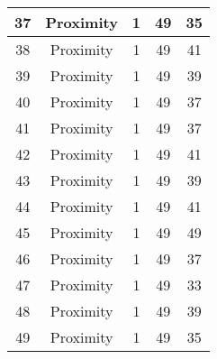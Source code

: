 \documentclass[results.tex]{subfiles}
\begin{document}
\begin{center}
\begin{tabular}{| c || c | c | c | c |}
            \hline
            37                      & Proximity                    & 1                      & 49                      & 35                   \\
            \hline
            38                      & Proximity                    & 1                      & 49                      & 41                   \\
            \hline
            39                      & Proximity                    & 1                      & 49                      & 39                   \\
            \hline
            40                      & Proximity                    & 1                      & 49                      & 37                   \\
            \hline
            41                      & Proximity                    & 1                      & 49                      & 37                   \\
            \hline
            42                      & Proximity                    & 1                      & 49                      & 41                   \\
            \hline
            43                      & Proximity                    & 1                      & 49                      & 39                   \\
            \hline
            44                      & Proximity                    & 1                      & 49                      & 41                   \\
            \hline
            45                      & Proximity                    & 1                      & 49                      & 49                   \\
            \hline
            46                      & Proximity                    & 1                      & 49                      & 37                   \\
            \hline
            47                      & Proximity                    & 1                      & 49                      & 33                   \\
            \hline
            48                      & Proximity                    & 1                      & 49                      & 39                   \\
            \hline
            49                      & Proximity                    & 1                      & 49                      & 35                   \\
            \hline
        \end{tabular}
    \end{center}
\end{document}
